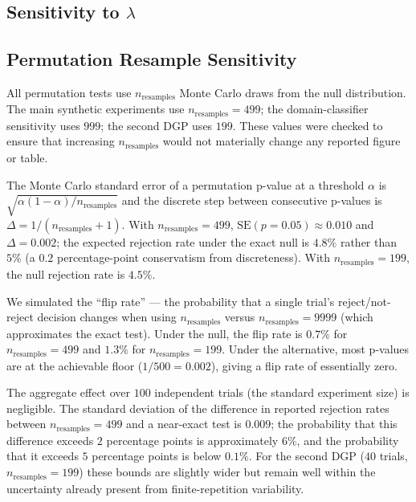 \subsection{Sensitivity to $\lambda$}
\label{app:lambda}


\subsection{Permutation Resample Sensitivity}
\label{app:perm-sensitivity}

All permutation tests use $n_{\text{resamples}}$ Monte Carlo draws from the null distribution.
The main synthetic experiments use $n_{\text{resamples}} = 499$; the domain-classifier sensitivity
uses $999$; the second DGP uses $199$. These values were checked to ensure that increasing
$n_{\text{resamples}}$ would not materially change any reported figure or table.

The Monte Carlo standard error of a permutation p-value at a threshold $\alpha$ is
$\sqrt{\alpha(1-\alpha)/n_{\text{resamples}}}$ and the discrete step between
consecutive p-values is $\Delta = 1/(n_{\text{resamples}}+1)$.
With $n_{\text{resamples}} = 499$, $\text{SE}(p = 0.05) \approx 0.010$ and
$\Delta = 0.002$; the expected rejection rate under the exact null is
$4.8\%$ rather than $5\%$ (a $0.2$ percentage-point conservatism from discreteness).
With $n_{\text{resamples}} = 199$, the null rejection rate is $4.5\%$.

We simulated the ``flip rate'' --- the probability that a single trial's
reject/not-reject decision changes when using $n_{\text{resamples}}$ versus
$n_{\text{resamples}} = 9999$ (which approximates the exact test). Under the null,
the flip rate is $0.7\%$ for $n_{\text{resamples}} = 499$ and $1.3\%$ for
$n_{\text{resamples}} = 199$. Under the alternative, most p-values are at the
achievable floor ($1/500 = 0.002$), giving a flip rate of essentially zero.

The aggregate effect over $100$ independent trials (the standard experiment
size) is negligible. The standard deviation of the difference in reported
rejection rates between $n_{\text{resamples}} = 499$ and a near-exact test
is $0.009$; the probability that this difference exceeds $2$ percentage points
is approximately $6\%$, and the probability that it exceeds $5$ percentage
points is below $0.1\%$. For the second DGP ($40$ trials, $n_{\text{resamples}} = 199$)
these bounds are slightly wider but remain well within the uncertainty already
present from finite-repetition variability.

